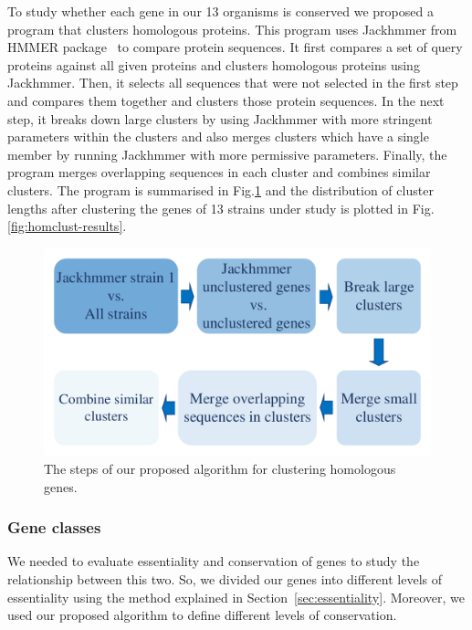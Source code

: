 \documentclass[12pt,letterpaper]{article}
\begin{document}
To study whether each gene in our 13 organisms is conserved we proposed a program that clusters homologous proteins. This program uses Jackhmmer from HMMER package~\cite{eddy_accelerated_2011} to compare protein sequences. It first compares a set of query proteins against all given proteins and clusters homologous proteins using Jackhmmer. Then, it selects all sequences that were not selected in the first step and compares them together and clusters those protein sequences. In the next step, it breaks down large clusters by using Jackhmmer with more stringent parameters within the clusters and also merges clusters which have a single member by running Jackhmmer with more permissive parameters. Finally, the program merges overlapping sequences in each cluster and combines similar clusters. The program is summarised in Fig.\@ \ref{fig:homclust} and the distribution of cluster lengths after clustering the genes of 13 strains under study is plotted in Fig.\@ \ref{fig:homclust-results}.

\begin{figure}
\includegraphics[scale=0.2]{homclust.pdf}
\caption{The steps of our proposed algorithm for clustering homologous genes.}
\label{fig:homclust}
\end{figure}

\subsubsection{Gene classes}
We needed to evaluate essentiality and conservation of genes to study the relationship between this two. So, we divided our genes into different levels of essentiality using the method explained in Section~\ref{sec:essentiality}. Moreover, we used our proposed algorithm to define different levels of conservation.
\end{document}
